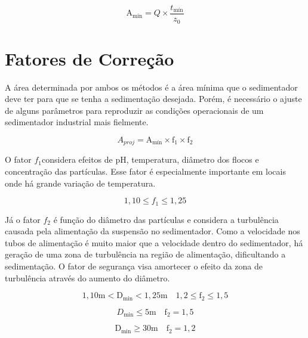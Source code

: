 \begin{equation}\label{key}
\operatorname{A_{\text{mín}}}=Q \times \frac{t_{\text{mín}}}{z_{0}}
\end{equation}


\section{Fatores de Correção}

A área determinada por ambos os métodos é a área mínima que o sedimentador deve ter para que se tenha a sedimentação desejada. Porém, é necessário o ajuste de alguns parâmetros para reproduzir as condições operacionais de um sedimentador industrial mais fielmente.


\begin{equation}\label{key}
A_{proj}=\operatorname{A_{\text{mín}}} \times \mathrm{f}_{1} \times \mathrm{f}_{2}
\end{equation}

O fator $ f_{1}  $considera efeitos de pH, temperatura, diâmetro dos flocos e concentração das partículas. Esse fator é especialmente importante em locais onde há grande variação de temperatura.

\begin{equation}\label{key}
1,10 \leq f_{1} \leq 1,25
\end{equation}


Já o fator $ f_{2} $ é função do diâmetro das partículas e considera a turbulência causada pela alimentação da suspensão no sedimentador. Como a velocidade nos tubos de alimentação é muito maior que a velocidade dentro do sedimentador, há geração de uma zona de turbulência na região de alimentação, dificultando a sedimentação. O fator de segurança visa amortecer o efeito da zona de turbulência através do aumento do diâmetro.

\begin{equation}\label{key}
1,10 \mathrm{m}<\mathrm{D}_{\mathrm{min}}<1,25 \mathrm{m} \quad 1,2 \leq \mathrm{f}_{2} \leq 1,5
\end{equation}

\begin{equation}\label{key}
D_{\min } \leq 5 \mathrm{m} \quad \mathrm{f}_{2}=1,5
\end{equation}

\begin{equation}\label{key}
\mathrm{D}_{\mathrm{min}} \geq 30 \mathrm{m} \quad \mathrm{f}_{2}=1,2
\end{equation}


